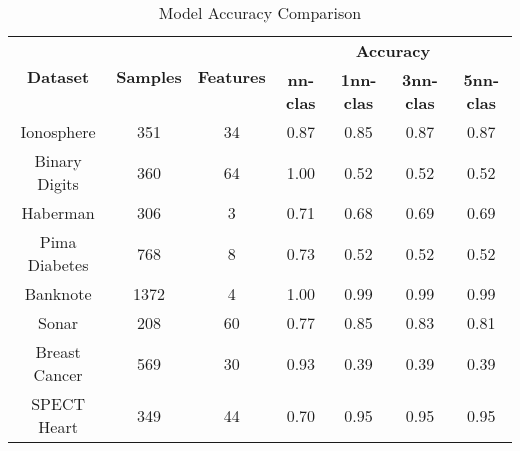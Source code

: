 \begin{table}[H]
\centering
\begin{tabular}{|c|c|c|c|c|c|c|}
\hline
\multirow{2}{*}{\textbf{Dataset}} & \multirow{2}{*}{\textbf{Samples}} & \multirow{2}{*}{\textbf{Features}} & \multicolumn{4}{c|}{\textbf{Accuracy}} \\ \cline{4-7}
 & & & \textbf{nn-clas} & \textbf{1nn-clas} & \textbf{3nn-clas} & \textbf{5nn-clas} \\ \hline
Ionosphere & 351 & 34 & 0.87 & 0.85 & 0.87 & 0.87 \\ \hline
Binary Digits & 360 & 64 & 1.00 & 0.52 & 0.52 & 0.52 \\ \hline
Haberman & 306 & 3 & 0.71 & 0.68 & 0.69 & 0.69 \\ \hline
Pima Diabetes & 768 & 8 & 0.73 & 0.52 & 0.52 & 0.52 \\ \hline
Banknote & 1372 & 4 & 1.00 & 0.99 & 0.99 & 0.99 \\ \hline
Sonar & 208 & 60 & 0.77 & 0.85 & 0.83 & 0.81 \\ \hline
Breast Cancer & 569 & 30 & 0.93 & 0.39 & 0.39 & 0.39 \\ \hline
SPECT Heart & 349 & 44 & 0.70 & 0.95 & 0.95 & 0.95 \\ \hline
\end{tabular}
\caption{Model Accuracy Comparison}
\label{tab:accuracy}
\end{table}